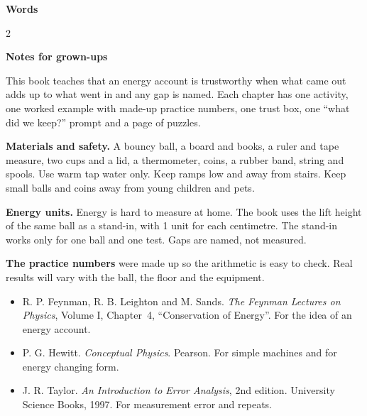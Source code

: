 \clearpage\label{notes}
{\sans\bfseries\LARGE\color{ink} Words}\par
\small
\begin{multicols}{2}
\end{multicols}

\vspace{0.4em}
{\sans\bfseries\large\color{sky!70!black} Notes for grown-ups}\par
This book teaches that an energy account is trustworthy when what came out adds up to what went in and any gap is named. Each chapter has one activity, one worked example with made-up practice numbers, one trust box, one ``what did we keep?'' prompt and a page of puzzles.

\textbf{Materials and safety.} A bouncy ball, a board and books, a ruler and tape measure, two cups and a lid, a thermometer, coins, a rubber band, string and spools. Use warm tap water only. Keep ramps low and away from stairs. Keep small balls and coins away from young children and pets.

\textbf{Energy units.} Energy is hard to measure at home. The book uses the lift height of the same ball as a stand-in, with 1 unit for each centimetre. The stand-in works only for one ball and one test. Gaps are named, not measured.

\textbf{The practice numbers} were made up so the arithmetic is easy to check. Real results will vary with the ball, the floor and the equipment.

\begin{itemize}[leftmargin=1.3em,itemsep=0.2em]
\item R. P. Feynman, R. B. Leighton and M. Sands. \emph{The Feynman Lectures on Physics}, Volume I, Chapter~4, ``Conservation of Energy''. For the idea of an energy account.
\item P. G. Hewitt. \emph{Conceptual Physics}. Pearson. For simple machines and for energy changing form.
\item J. R. Taylor. \emph{An Introduction to Error Analysis}, 2nd edition. University Science Books, 1997. For measurement error and repeats.
\end{itemize}

